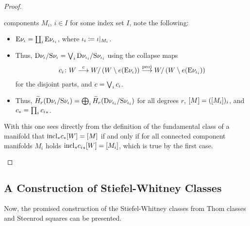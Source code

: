 \begin{Lem}
\begin{proof}
\begin{description}
      components $M_i$, $i\in I$ for some index set $I$, note the following:
      \begin{itemize}
      \item $\mathrm{E}\nu_{{\iota}} = \coprod_i\mathrm{E}\nu_{{\iota}_i}$,
        where ${\iota}_i\coloneqq{\iota}|_{M_i}$.
      \item Thus, $\mathrm{D}\nu_{{\iota}}/\mathrm{S}\nu_{{\iota}} = \bigvee_i\mathrm{D}\nu_{{\iota}_i}/\mathrm{S}\nu_{{\iota}_i}$ using the
        collapse maps
        \begin{gather*}
          c_i\colon
           W
          \overset{c}{\longrightarrow}
           W/\left( W\setminus e(\mathrm{E}\nu_{{\iota}})\right)
          \overset{\mathrm{proj}}{\longrightarrow}
           W/\left( W\setminus e(\mathrm{E}\nu_{{\iota}_i})\right)
        \end{gather*}
        for the disjoint parts,
        and $c=\bigvee_ic_i$.
      \item Thus,
        $\widetilde{H}_r(\mathrm{D}\nu_{{\iota}}/\mathrm{S}\nu_{{\iota}})
        = \bigoplus_i \widetilde{H}_r(\mathrm{D}\nu_{{\iota}_i}/\mathrm{S}\nu_{{\iota}_i})$ for
        all degrees $r$, $[M] = ([M_i])_i$, and
        ${c}_* = \prod_i{c_i}_*$.
      \end{itemize}
      With this one sees directly from the definition of the fundamental
      class of a manifold that
      ${\mathrm{incl}}_*{c}_*[ W] = [M]$
      if and only if for all connected component manifolds $M_i$ holds
      ${\mathrm{incl}}_*{c_i}_*[ W] = [M_i]$,
      which is true by the first case.
      \qedhere
    \end{description}
  \end{proof}
\end{Lem}

\subsection{A Construction of Stiefel-Whitney Classes}
\label{sec:swclsconstruction}
Now, the promised construction of the Stiefel-Whitney classes from
Thom classes and Steenrod squares can be presented.

